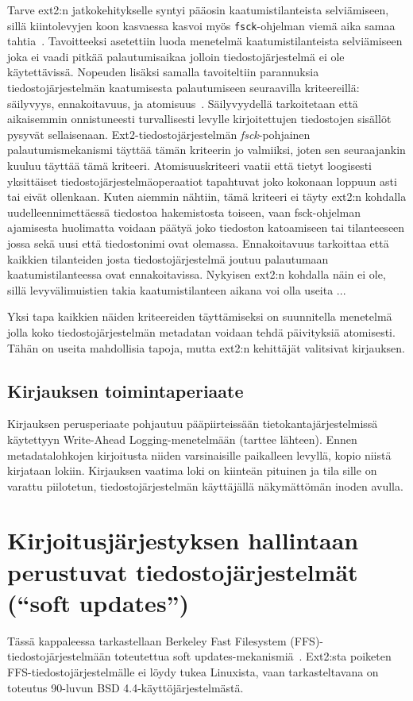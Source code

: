 Tarve ext2:n jatkokehitykselle syntyi pääosin kaatumistilanteista selviämiseen,
sillä kiintolevyjen koon kasvaessa kasvoi myös \texttt{fsck}-ohjelman viemä aika samaa tahtia~\cite{Ext2Journal}.
Tavoitteeksi asetettiin luoda menetelmä kaatumistilanteista selviämiseen joka ei vaadi pitkää palautumisaikaa jolloin tiedostojärjestelmä ei ole käytettävissä.
Nopeuden lisäksi samalla tavoiteltiin parannuksia tiedostojärjestelmän kaatumisesta palautumiseen seuraavilla kriteereillä: säilyvyys, ennakoitavuus, ja atomisuus~\cite{Ext2Journal}.
Säilyvyydellä tarkoitetaan että aikaisemmin onnistuneesti turvallisesti levylle kirjoitettujen tiedostojen sisällöt pysyvät sellaisenaan.
Ext2-tiedostojärjestelmän \emph{fsck}-pohjainen palautumismekanismi täyttää tämän kriteerin jo valmiiksi,
joten sen seuraajankin kuuluu täyttää tämä kriteeri.
Atomisuuskriteeri vaatii että tietyt loogisesti yksittäiset tiedostojärjestelmäoperaatiot tapahtuvat
joko kokonaan loppuun asti tai eivät ollenkaan.
Kuten aiemmin nähtiin, tämä kriteeri ei täyty ext2:n kohdalla uudelleennimettäessä tiedostoa hakemistosta toiseen,
vaan fsck-ohjelman ajamisesta huolimatta voidaan päätyä joko tiedoston katoamiseen tai tilanteeseen jossa sekä uusi että tiedostonimi ovat olemassa.
Ennakoitavuus tarkoittaa että kaikkien tilanteiden josta tiedostojärjestelmä joutuu palautumaan kaatumistilanteessa ovat ennakoitavissa.
Nykyisen ext2:n kohdalla näin ei ole, sillä levyvälimuistien takia kaatumistilanteen aikana voi olla useita ...

Yksi tapa kaikkien näiden kriteereiden täyttämiseksi on suunnitella menetelmä jolla koko tiedostojärjestelmän metadatan voidaan tehdä päivityksiä atomisesti.
Tähän on useita mahdollisia tapoja, mutta ext2:n kehittäjät valitsivat kirjauksen.

\subsection{Kirjauksen toimintaperiaate}

Kirjauksen perusperiaate pohjautuu pääpiirteissään tietokantajärjestelmissä käytettyyn Write-Ahead Logging-menetelmään (tarttee lähteen).
Ennen metadatalohkojen kirjoitusta niiden varsinaisille paikalleen levyllä, kopio niistä kirjataan lokiin.
Kirjauksen vaatima loki on kiinteän pituinen ja tila sille on varattu piilotetun, tiedostojärjestelmän käyttäjällä näkymättömän inoden avulla.

\section{Kirjoitusjärjestyksen hallintaan perustuvat tiedostojärjestelmät (``soft updates'')}
\label{ChapSoftUpdates}
Tässä kappaleessa tarkastellaan Berkeley Fast Filesystem (FFS)-tiedostojärjestelmään toteutettua soft updates-mekanismiä~\cite{SoftUpdatesFfs}.
Ext2:sta poiketen FFS-tiedostojärjestelmälle ei löydy tukea Linuxista,
vaan tarkasteltavana on toteutus 90-luvun BSD 4.4-käyttöjärjestelmästä.

